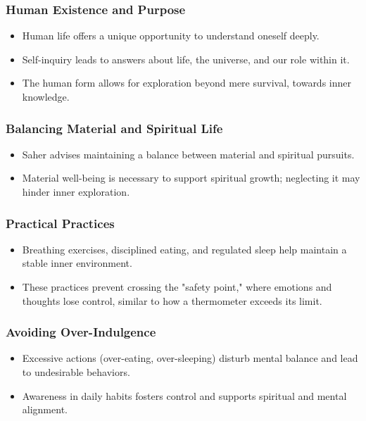 \begin{frame}[fragile]\frametitle{Human Existence and Purpose}
    \begin{itemize}
        \item Human life offers a unique opportunity to understand oneself deeply.
        \item Self-inquiry leads to answers about life, the universe, and our role within it.
        \item The human form allows for exploration beyond mere survival, towards inner knowledge.
    \end{itemize}
\end{frame}

\begin{frame}[fragile]\frametitle{Balancing Material and Spiritual Life}
    \begin{itemize}
        \item Saher advises maintaining a balance between material and spiritual pursuits.
        \item Material well-being is necessary to support spiritual growth; neglecting it may hinder inner exploration.
    \end{itemize}
\end{frame}

\begin{frame}[fragile]\frametitle{Practical Practices}
    \begin{itemize}
        \item Breathing exercises, disciplined eating, and regulated sleep help maintain a stable inner environment.
        \item These practices prevent crossing the "safety point," where emotions and thoughts lose control, similar to how a thermometer exceeds its limit.
    \end{itemize}
\end{frame}

\begin{frame}[fragile]\frametitle{Avoiding Over-Indulgence}
    \begin{itemize}
        \item Excessive actions (over-eating, over-sleeping) disturb mental balance and lead to undesirable behaviors.
        \item Awareness in daily habits fosters control and supports spiritual and mental alignment.
    \end{itemize}
\end{frame}

